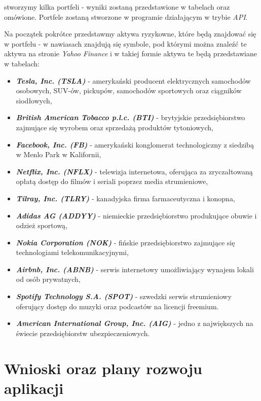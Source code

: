 \documentclass[magister]{dyplom}
\begin{document}
stworzymy kilka portfeli - wyniki zostaną przedstawione w tabelach oraz omówione. Portfele zostaną stworzone w programie działającym w trybie \textit{API}.

Na początek pokrótce przedstawmy aktywa ryzykowne, które będą znajdować się w portfelu - w nawiasach znajdują się symbole, pod którymi można znaleźć te aktywa na stronie \textit{Yahoo Finance} i w takiej formie aktywa te będą przedstawiane w tabelach:

\begin{itemize}
	\item \textit{\textbf{Tesla, Inc. (TSLA)}} - amerykański producent elektrycznych samochodów osobowych, SUV-ów, pickupów, samochodów sportowych oraz ciągników siodłowych\cite{tesla},
	\item \textit{\textbf{British American Tobacco p.l.c. (BTI)}} - brytyjskie przedsiębiorstwo zajmujące się wyrobem oraz sprzedażą produktów tytoniowych,
	\item \textit{\textbf{Facebook, Inc. (FB)}} - amerykański konglomerat technologiczny z siedzibą w Menlo Park w Kalifornii\cite{facebook},
	\item \textit{\textbf{Netflix, Inc. (NFLX)}} - telewizja internetowa, oferująca za zryczałtowaną opłatą dostęp do filmów i seriali poprzez media strumieniowe\cite{netflix},
	\item \textit{\textbf{Tilray, Inc. (TLRY)}} - kanadyjska firma farmaceutyczna i konopna\cite{tilray},
	\item \textit{\textbf{Adidas AG (ADDYY)}} - niemieckie przedsiębiorstwo produkujące obuwie i odzież sportową\cite{adidas},
	\item \textit{\textbf{Nokia Corporation (NOK)}} - fińskie przedsiębiorstwo zajmujące się technologiami telekomunikacyjnymi\cite{nokia},
	\item \textit{\textbf{Airbnb, Inc. (ABNB)}} - serwis internetowy umożliwiający wynajem lokali od osób prywatnych\cite{airbnb},
	\item \textit{\textbf{Spotify Technology S.A. (SPOT)}} - szwedzki serwis strumieniowy oferujący dostęp do muzyki oraz podcastów na licencji freemium\cite{spotify}.
	\item \textit{\textbf{American International Group, Inc. (AIG)}} - jedno z największych na świecie przedsiębiorstw ubezpieczeniowych\cite{aig}.
\end{itemize}



\chapter{Wnioski oraz plany rozwoju aplikacji}
\end{document}
